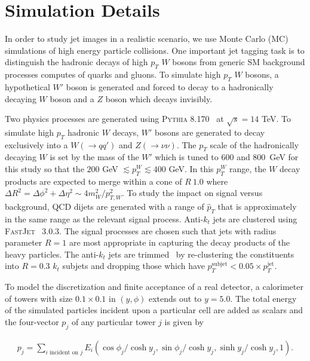 
\section{Simulation Details}
\label{sec:simulation}

In order to study jet images in a realistic scenario, we use Monte Carlo (MC) simulations of high energy particle collisions. One important jet tagging task is to distinguish the hadronic decays of high $p_T$ $W$ bosons from generic SM background processes computes of quarks and gluons.  To simulate high $p_T$ $W$ bosons, a hypothetical $W'$ boson is generated and forced to decay to a hadronically decaying $W$ boson and a $Z$ boson which decays invisibly.


Two physics processes are generated using \textsc{Pythia} 8.170~\cite{Pythia8,Pythia} at $\sqrt{s}=14$ TeV.   To simulate high $p_T$ hadronic $W$ decays, $W'$ bosons are generated to decay exclusively into a $W(\rightarrow qq')$ and $Z(\rightarrow\nu\nu)$.  The $p_T$ scale of the hadronically decaying $W$ is set by the mass of the $W'$ which is tuned to 600 and 800~GeV for this study so that the $200$ GeV $\lesssim p_T^W \lesssim 400$ GeV. In this $p_T^W$ range, the $W$ decay products are expected to merge within a cone of $R~1.0$ where $\Delta R^2=\Delta\phi^2+\Delta\eta^2\sim 4m_W^2/p_{T,W}^2$.  To study the impact on signal versus background, QCD dijets are generated with a range of $\hat{p}_T$ that is approximately in the same range as the relevant signal process.  Anti-$k_t$ jets are clustered using \textsc{FastJet}~\cite{fastjet} 3.0.3.  The signal processes are chosen such that jets with radius parameter $R = 1$ are most appropriate in capturing the decay products of the heavy particles.  The anti-$k_t$ jets are trimmed~\cite{trimming} by re-clustering the constituents into $R=0.3$ $k_t$ subjets and dropping those which have $p_T^\text{subjet}<0.05\times p_T^\text{jet}$. 

To model the discretization and finite acceptance of a real detector, a calorimeter of towers with size $0.1\times 0.1$ in $(y,\phi)$ extends out to $y=5.0$.  The total energy of the simulated particles incident upon a particular cell are added as scalars and the four-vector $p_j$ of any particular tower $j$ is given by

\begin{align}
\label{eq:calo}
p_j = \sum_{i\text{ incident on $j$}}E_i(\cos\phi_j/\cosh y_j,\sin\phi_j/\cosh y_j,\sinh y_j/\cosh y_j,1).
\end{align}


